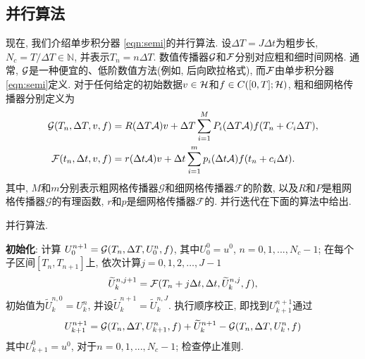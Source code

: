 \subsection{并行算法}\label{ssec:Parareal}
现在, 我们介绍单步积分器 \eqref{eqn:semi}的并行算法. 设$\Delta T = J \Delta t$为粗步长, $N_c = T/\Delta T\in \mathbb{N}$, 并表示$T_n = n\Delta T$. 数值传播器${\mathcal G}$和${\mathcal F}$分别对应粗和细时间网格. 通常, ${\mathcal G}$是一种便宜的、低阶数值方法(例如, 后向欧拉格式), 而${\mathcal F}$由单步积分器 \eqref{eqn:semi}定义. 对于任何给定的初始数据$v\in {\mathcal{H}}$和$f\in C([0,T];{\mathcal{H}})$, 粗和细网格传播器分别定义为
\begin{align}
	{\mathcal G}(T_n,\Delta T,v,f) &= R({\Delta T} {\mathcal{A}}) v + {\Delta T} \sum_{i=1}^{M} P_i({\Delta T} {\mathcal{A}}) f(T_n+C_i\Delta T) , \label{eqn:coarse-integrator}\\
	{\mathcal F}(t_n,\Delta t,v,f) &= r({\Delta t} {\mathcal{A}}) v + {\Delta t} \sum_{i=1}^{m} p_i({\Delta t} {\mathcal{A}}) f(t_n+c_i\Delta t). \label{eq: integrator}
\end{align}
其中, $M$和$m$分别表示粗网格传播器$\mathcal{G}$和细网格传播器$\mathcal{F}$的阶数, 以及$R$和$P$是粗网格传播器$\mathcal{G}$的有理函数, $r$和$p$是细网格传播器$\mathcal{F}$的. 并行迭代在下面的算法中给出. 

\begin{algorithm}[ht]

	\caption{并行算法. }
	\begin{algorithmic}[1]\label{alg:para}
		\State \textbf{初始化}:
		计算
		$U_0^{n+1} = {\mathcal G}(T_n,\Delta T, U_0^{n}, f)$, 其中$U_0^0 =u^0$, $n =0,1,...,N_c - 1$;
		\State 在每个子区间$[T_n,T_{n+1}]$上, 依次计算$j=0,1,2,\dots,J-1$
		$$  \widetilde U^{n, j+1}_{k} = {\mathcal F}(T_n+j \Delta t, \Delta t, \widetilde U^{n, j}_{k},f), $$
		初始值为$ \widetilde U^{n, 0}_{k} = U_k^n$, 并设$\widetilde U^{n+1}_{k} =  \widetilde U^{n, J}_{k}$. \vskip5pt
		\State 执行顺序校正, 即找到$U_{k+1}^{n+1}$通过
		$$  U_{k+1}^{n+1} = {\mathcal G}(T_n, \Delta T, U_{k+1}^{n}, f)  + \widetilde U^{n+1}_{k} -   {\mathcal G}(T_n, \Delta T, U_{k}^{n}, f) $$
		其中$U_{k+1}^0 = u^0$, 对于$n =  0,1,...,N_c - 1$;\vskip5pt
		\State 检查停止准则. 
		\EndFor
	\end{algorithmic}
\end{algorithm}

